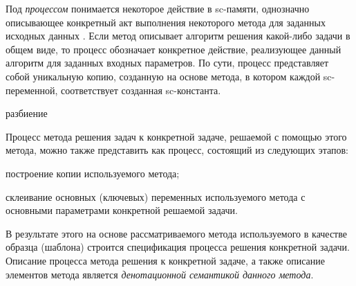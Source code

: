 Под \textit{процессом} понимается некоторое действие в sc-памяти, однозначно описывающее конкретный акт выполнения некоторого метода для заданных исходных данных \cite{Deikstra1978}. Если метод описывает алгоритм решения какой-либо задачи в общем виде, то процесс обозначает конкретное действие, реализующее данный алгоритм для заданных входных параметров. По сути, процесс представляет собой уникальную копию, созданную на основе метода, в котором каждой sc-переменной, соответствует созданная sc-константа.

\begin{SCn}
\begin{scnrelfromset}{разбиение}
\end{scnrelfromset}
\end{SCn}

Процесс  метода решения задач к конкретной задаче, решаемой с помощью этого метода, можно также представить как процесс, состоящий из следующих этапов:
\begin{textitemize}
    \item построение копии используемого метода;
    \item склеивание основных (ключевых) переменных используемого метода с основными параметрами конкретной решаемой задачи.
\end{textitemize}

В результате этого на основе рассматриваемого метода используемого в качестве образца (шаблона) строится спецификация процесса решения конкретной задачи. Описание процесса  метода решения к конкретной задаче, а также описание элементов метода является \textit{денотационной семантикой данного метода}.

